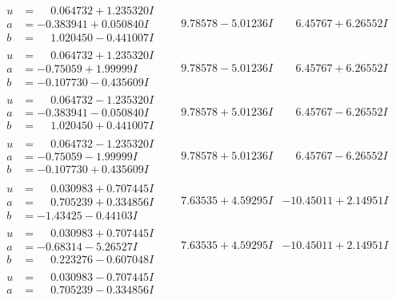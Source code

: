 \documentclass[1p]{elsarticle_modified}
\theoremstyle{definition}
\begin{document}
$$\begin{array}{c|c|c}
\begin{aligned}
u &= \phantom{-}0.064732 + 1.235320 I \\
a &= -0.383941 + 0.050840 I \\
b &= \phantom{-}1.020450 - 0.441007 I\end{aligned}
 & \phantom{-}9.78578 - 5.01236 I & \phantom{-}6.45767 + 6.26552 I \\ \hline\begin{aligned}
u &= \phantom{-}0.064732 + 1.235320 I \\
a &= -0.75059 + 1.99999 I \\
b &= -0.107730 - 0.435609 I\end{aligned}
 & \phantom{-}9.78578 - 5.01236 I & \phantom{-}6.45767 + 6.26552 I \\ \hline\begin{aligned}
u &= \phantom{-}0.064732 - 1.235320 I \\
a &= -0.383941 - 0.050840 I \\
b &= \phantom{-}1.020450 + 0.441007 I\end{aligned}
 & \phantom{-}9.78578 + 5.01236 I & \phantom{-}6.45767 - 6.26552 I \\ \hline\begin{aligned}
u &= \phantom{-}0.064732 - 1.235320 I \\
a &= -0.75059 - 1.99999 I \\
b &= -0.107730 + 0.435609 I\end{aligned}
 & \phantom{-}9.78578 + 5.01236 I & \phantom{-}6.45767 - 6.26552 I \\ \hline\begin{aligned}
u &= \phantom{-}0.030983 + 0.707445 I \\
a &= \phantom{-}0.705239 + 0.334856 I \\
b &= -1.43425 - 0.44103 I\end{aligned}
 & \phantom{-}7.63535 + 4.59295 I & -10.45011 + 2.14951 I \\ \hline\begin{aligned}
u &= \phantom{-}0.030983 + 0.707445 I \\
a &= -0.68314 - 5.26527 I \\
b &= \phantom{-}0.223276 - 0.607048 I\end{aligned}
 & \phantom{-}7.63535 + 4.59295 I & -10.45011 + 2.14951 I \\ \hline\begin{aligned}
u &= \phantom{-}0.030983 - 0.707445 I \\
a &= \phantom{-}0.705239 - 0.334856 I \\

\end{aligned}
\end{array}$$
\end{document}
